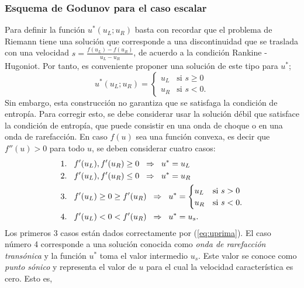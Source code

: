 \subsubsection{Esquema de Godunov para el caso escalar}
Para definir la función $u^{*}(u_L; u_R)$ basta con recordar que el problema de Riemann tiene una solución que corresponde a una discontinuidad que se traslada con una velocidad $s=\frac{f(u_L)-f(u_R)}{u_L - u_R}$, de acuerdo a la condición Rankine - Hugoniot. Por tanto, es conveniente proponer una solución de este tipo para $u^{*}$; 
\begin{equation}
	u^{*}(u_L; u_R) = 
	\begin{cases}
		u_L & \text{si } s \geq 0\\
		u_R & \text{si } s < 0.
	\end{cases}
\label{eq:uprima}
\end{equation}
Sin embargo, esta construcción no garantiza que se satisfaga la condición de entropía. Para corregir esto, se debe considerar usar la solución débil que satisface la condición de entropía, que puede consistir en una onda de choque o en una onda de rarefacción. En caso $f(u)$ sea una función convexa, es decir que $f''(u)>0$ para todo $u$, se deben considerar cuatro casos:
\begin{align}
	1.\hspace{3mm}&f'(u_L),f'(u_R) \geq 0 \hspace{2mm} \Rightarrow \hspace{2mm} u^{*} = u_L \\
	2.\hspace{3mm}&f'(u_L),f'(u_R) \leq 0 \hspace{2mm} \Rightarrow \hspace{2mm} u^{*} = u_R \\
	3.\hspace{3mm}&f'(u_L) \geq 0 \geq f'(u_R) \hspace{2mm} \Rightarrow  \hspace{2mm} u^{*} = 
	\begin{cases}
		u_L & \text{si } s > 0\\
		u_R & \text{si } s < 0.
	\end{cases} \\
	4. \hspace{3mm}&f'(u_L) < 0 < f'(u_R) \hspace{2mm} \Rightarrow  \hspace{2mm} u^{*} = u_{s}.
\end{align}
Los primeros 3 casos están dados correctamente por (\ref{eq:uprima}). El caso número 4 corresponde a una solución conocida como  \textit{onda de rarefacción transónica} y la función $u^{*}$ toma el valor intermedio $u_s$. Este valor se conoce como \textit{punto sónico} y representa el valor de $u$ para el cual la velocidad característica es cero. Esto es,
